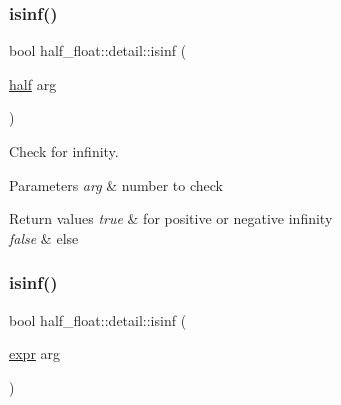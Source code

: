 \subsubsection{\texorpdfstring{isinf()}{isinf()}\hspace{0.1cm}{\footnotesize\ttfamily [1/2]}}
{\footnotesize\ttfamily bool half\+\_\+float\+::detail\+::isinf (\begin{DoxyParamCaption}\item[{\hyperlink{classhalf__float_1_1half}{half}}]{arg }\end{DoxyParamCaption})\hspace{0.3cm}{\ttfamily [inline]}}

Check for infinity. 
\begin{DoxyParams}{Parameters}
{\em arg} & number to check \\
\hline
\end{DoxyParams}

\begin{DoxyRetVals}{Return values}
{\em true} & for positive or negative infinity \\
\hline
{\em false} & else \\
\hline
\end{DoxyRetVals}
\mbox{\label{namespacehalf__float_1_1detail_a072ecb80d48fc55231963d6a36c2abe4}} 
\subsubsection{\texorpdfstring{isinf()}{isinf()}\hspace{0.1cm}{\footnotesize\ttfamily [2/2]}}
{\footnotesize\ttfamily bool half\+\_\+float\+::detail\+::isinf (\begin{DoxyParamCaption}\item[{\hyperlink{structhalf__float_1_1detail_1_1expr}{expr}}]{arg }\end{DoxyParamCaption})\hspace{0.3cm}{\ttfamily [inline]}}

\mbox{\label{namespacehalf__float_1_1detail_a38cad803bcd84b49ef25e9181678284e}} 
